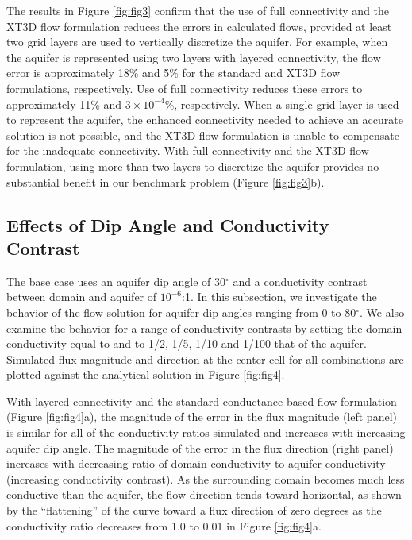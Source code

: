 \documentclass{article}
\begin{document}
The results in Figure \ref{fig:fig3} confirm that the use of full connectivity and the XT3D flow formulation reduces the errors in calculated flows, provided at least two grid layers are used to vertically discretize the aquifer. For example, when the aquifer is represented using two layers with layered connectivity, the flow error is approximately 18\% and 5\% for the standard and XT3D flow formulations, respectively. Use of full connectivity reduces these errors to approximately 11\% and $3 \times 10^{-4}$\%, respectively. When a single grid layer is used to represent the aquifer, the enhanced connectivity needed to achieve an accurate solution is not possible, and the XT3D flow formulation is unable to compensate for the inadequate connectivity. With full connectivity and the XT3D flow formulation, using more than two layers to discretize the aquifer provides no substantial benefit in our benchmark problem (Figure \ref{fig:fig3}b).

\subsection*{Effects of Dip Angle and Conductivity Contrast}

The base case uses an aquifer dip angle of 30$^{\circ}$ and a conductivity contrast between domain and aquifer of $10^{-6}$:1. In this subsection, we investigate the behavior of the flow solution for aquifer dip angles ranging from 0 to 80$^{\circ}$. We also examine the behavior for a range of conductivity contrasts by setting the domain conductivity equal to and to 1/2, 1/5, 1/10 and 1/100 that of the aquifer. Simulated flux magnitude and direction at the center cell for all combinations are plotted against the analytical solution in Figure \ref{fig:fig4}. 

With layered connectivity and the standard conductance-based flow formulation (Figure \ref{fig:fig4}a), the magnitude of the error in the flux magnitude (left panel) is similar for all of the conductivity ratios simulated and increases with increasing aquifer dip angle. The magnitude of the error in the flux direction (right panel) increases with decreasing ratio of domain conductivity to aquifer conductivity (increasing conductivity contrast). As the surrounding domain becomes much less conductive than the aquifer, the flow direction tends toward horizontal, as shown by the ``flattening'' of the curve toward a flux direction of zero degrees as the conductivity ratio decreases from 1.0 to 0.01 in Figure \ref{fig:fig4}a.
\end{document}

